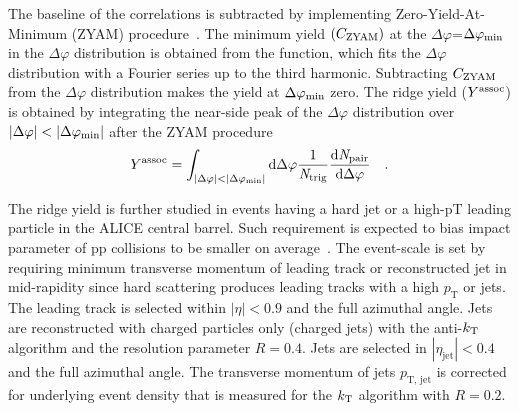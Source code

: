 The baseline of the correlations is subtracted by implementing Zero-Yield-At-Minimum (ZYAM) procedure~\cite{Ajitanand:2005jj}. The minimum yield $(C_{\rm{ZYAM}})$ at the $\Delta\varphi$=$\Delta\varphi_{\rm{min}}$ in the $\Delta\varphi$ distribution is obtained from the function, which fits the $\Delta\varphi$ distribution with a Fourier series up to the third harmonic. Subtracting $C_{\rm{ZYAM}}$ from the $\Delta\varphi$ distribution makes the yield at $\Delta\varphi_{\rm{min}}$ zero. The ridge yield ($Y^{\rm{assoc}}$) is obtained by integrating the near-side peak of the $\Delta\varphi$ distribution over $|\Delta\varphi|<|\Delta\varphi_{\rm{min}}|$ after the ZYAM procedure
\begin{eqnarray}
Y^{\rm{assoc}} = \int_{|\Delta \varphi| < |\Delta\varphi_{\rm{min}}| } \rm{d} \Delta\varphi \frac{1}{\it{N}_{\rm{trig}}} \frac{ \rm{d}\it{}N_{\rm{pair}} }{ \rm{d}\Delta\varphi } \quad.
\end{eqnarray}

The ridge yield is further studied in events having a hard jet or a high-pT leading particle in the ALICE central barrel. Such requirement is expected to bias impact parameter of pp collisions to be smaller on average~\cite{Sjostrand:1986ep,Frankfurt:2010ea}.
The event-scale is set by requiring minimum transverse momentum of leading track or reconstructed jet in mid-rapidity since hard scattering produces leading tracks with a high $p_\mathrm{T}$ or jets. The leading track is selected within $|\eta|<0.9$ and the full azimuthal angle. Jets are reconstructed with charged particles only (charged jets) with the anti-$k_{\rm{T}}$ algorithm and the resolution parameter $R = 0.4$. Jets are selected in $|\eta_\mathrm{jet}|<0.4$ and the full azimuthal angle. The transverse momentum of jets $p_\mathrm{T,\,jet}$ is corrected for underlying event density that is measured for the $k_{\rm{T}}$ algorithm with $R = 0.2$. 

